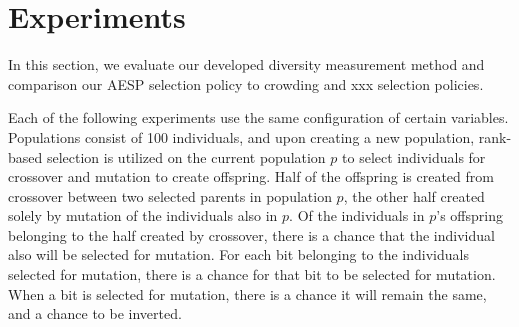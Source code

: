 \section{Experiments}
In this section, we evaluate our developed diversity measurement method and comparison our AESP selection policy to crowding and xxx selection policies.

Each of the following experiments use the same configuration of certain variables. Populations consist of \num{100} individuals, and upon creating a new population, rank-based selection is utilized on the current population $p$ to select individuals for crossover and mutation to create offspring. Half of the offspring is created from crossover between two selected parents in population $p$, the other half created solely by mutation of the individuals also in $p$. Of the individuals in $p$'s offspring belonging to the half created by crossover, there is a  chance that the individual also will be selected for mutation. For each bit belonging to the individuals selected for mutation, there is a  chance for that bit to be selected for mutation. When a bit is selected for mutation, there is a  chance it will remain the same, and a  chance to be inverted.



